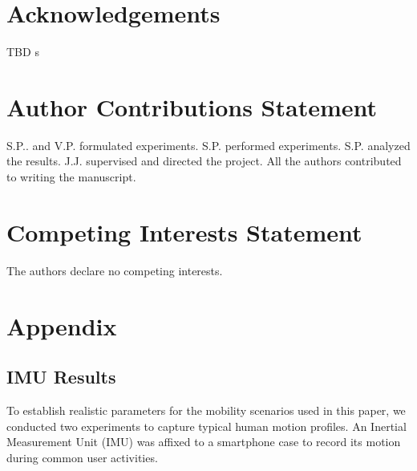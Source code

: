 \documentclass[fleqn,10pt]{wlscirep}
\begin{document}








\section*{Acknowledgements}
{\color{red}TBD}
s

\section*{Author Contributions Statement}
S.P.. and V.P. formulated experiments. S.P. performed experiments. S.P. analyzed the results. J.J. supervised and directed the project. All the authors contributed to writing the manuscript.


\section*{Competing Interests Statement}
The authors declare no competing interests.

\newpage
\section*{Appendix}
\subsection*{IMU Results}
To establish realistic parameters for the mobility scenarios used in this paper, we conducted two experiments to capture typical human motion profiles. An Inertial Measurement Unit (IMU) was affixed to a smartphone case to record its motion during common user activities.
\end{document}
